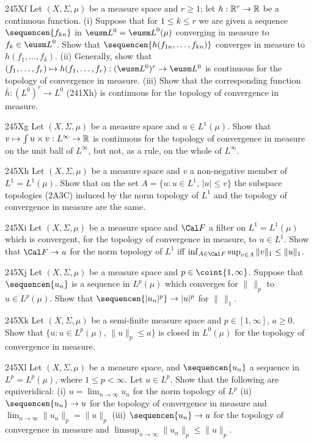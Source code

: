 {\spheader 245Xf Let $(X,\Sigma,\mu)$ be a measure space and $r\ge 1$;
let $h:\Bbb R^r\to\Bbb R$ be a continuous function.   (i) Suppose that
for $1\le k\le r$ we are given a sequence $\sequencen{f_{kn}}$ in
$\eusm L^0={\eusm L}^0(\mu)$ converging in measure to
$f_k\in{\eusm L}^0$.      Show that
$\sequencen{h(f_{1n},\ldots,f_{kn})}$ converges in measure to
$h(f_1,\ldots,f_k)$.   (ii) Generally, show that
$(f_1,\ldots,f_r)\mapsto h(f_1,\ldots,f_r):(\eusm L^0)^r\to\eusm L^0$ is
continuous for the topology of convergence in measure.   (iii) Show that
the corresponding function $\bar h:(L^0)^r\to L^0$ (241Xh) is
continuous for the topology of convergence in measure.

\spheader 245Xg Let $(X,\Sigma,\mu)$ be a measure space and
$u\in L^1(\mu)$.   Show that
$v\mapsto\int u\times v:L^{\infty}\to\Bbb R$ is continuous for the
topology of convergence in measure on the unit ball of $L^{\infty}$, but
not, as a rule, on the whole of $L^{\infty}$.

\spheader 245Xh Let $(X,\Sigma,\mu)$ be a measure space and $v$ a
non-negative member of $L^1=L^1(\mu)$.   Show that on the set
$A=\{u:u\in L^1,\,|u|\le v\}$ the subspace topologies (2A3C) induced
by the norm topology of $L^1$ and the topology of convergence in measure
are the same.   

\spheader 245Xi Let $(X,\Sigma,\mu)$ be a measure space and $\Cal F$ a
filter on $L^1=L^1(\mu)$ which is convergent, for the topology of
convergence in measure, to $u\in L^1$.   Show that $\Cal F\to u$ for the
norm topology of $L^1$ iff
$\inf_{A\in\Cal F}\sup_{v\in A}\|v\|_1\le\|u\|_1$.

\spheader 245Xj Let $(X,\Sigma,\mu)$ be a measure space and
$p\in\coint{1,\infty}$.   Suppose that $\sequencen{u_n}$ is a sequence in
$L^p(\mu)$ which converges for $\|\,\|_p$ to $u\in L^p(\mu)$.
Show that $\sequencen{|u_n|^p}\to|u|^p$ for $\|\,\|_1$.

\sqheader 245Xk Let $(X,\Sigma,\mu)$ be a semi-finite measure space and
$p\in[1,\infty]$, $a\ge 0$.   Show that
$\{u:u\in L^p(\mu),\,\|u\|_p\le a\}$ is closed in $L^0(\mu)$ for the
topology of convergence in measure.

\spheader 245Xl Let $(X,\Sigma,\mu)$ be a measure space, and
$\sequencen{u_n}$ a sequence in $L^p=L^p(\mu)$, where $1\le p<\infty$.
Let $u\in L^p$.   Show that the following are equiveridical:  (i)
$u=\lim_{n\to\infty}u_n$ for the norm
topology of $L^p$ (ii) $\sequencen{u_n}\to u$ for the topology of
convergence in measure and $\lim_{n\to\infty}\|u_n\|_p=\|u\|_p$
(iii) $\sequencen{u_n}\to u$ for the topology of
convergence in measure and $\limsup_{n\to\infty}\|u_n\|_p\le\|u\|_p$.

}
